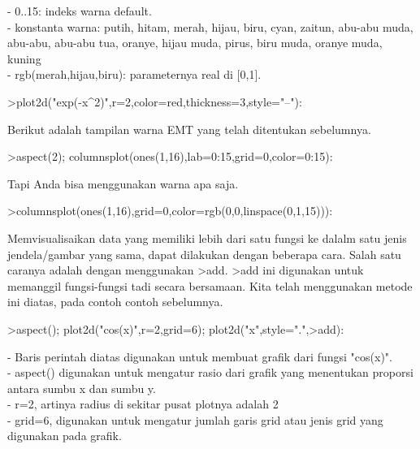 \documentclass[a4paper,10pt]{article}
\begin{document}
\begin{eulernotebook}
\begin{eulercomment}
\begin{eulercomment}
\begin{eulercomment}
\begin{eulercomment}
\begin{eulercomment}
- 0..15: indeks warna default.\\
- konstanta warna: putih, hitam, merah, hijau, biru, cyan, zaitun,
abu-abu muda, abu-abu, abu-abu tua, oranye, hijau muda, pirus, biru
muda, oranye muda, kuning\\
- rgb(merah,hijau,biru): parameternya real di [0,1].
\end{eulercomment}
\begin{eulerprompt}
>plot2d("exp(-x^2)",r=2,color=red,thickness=3,style="--"):
\end{eulerprompt}
\begin{eulercomment}
Berikut adalah tampilan warna EMT yang telah ditentukan sebelumnya.
\end{eulercomment}
\begin{eulerprompt}
>aspect(2); columnsplot(ones(1,16),lab=0:15,grid=0,color=0:15):
\end{eulerprompt}
\begin{eulercomment}
Tapi Anda bisa menggunakan warna apa saja.
\end{eulercomment}
\begin{eulerprompt}
>columnsplot(ones(1,16),grid=0,color=rgb(0,0,linspace(0,1,15))):
\end{eulerprompt}
\begin{eulercomment}
Memvisualisaikan data yang memiliki lebih dari satu fungsi ke dalalm
satu jenis jendela/gambar yang sama, dapat dilakukan dengan beberapa
cara. Salah satu caranya adalah dengan menggunakan \textgreater{}add. \textgreater{}add ini
digunakan untuk memanggil fungsi-fungsi tadi secara bersamaan. Kita
telah menggunakan metode ini diatas, pada contoh contoh sebelumnya.
\end{eulercomment}
\begin{eulerprompt}
>aspect(); plot2d("cos(x)",r=2,grid=6); plot2d("x",style=".",>add):
\end{eulerprompt}
\begin{eulercomment}
- Baris perintah diatas digunakan untuk membuat grafik dari fungsi
"cos(x)".\\
- aspect() digunakan untuk mengatur rasio dari grafik yang menentukan
proporsi antara sumbu x dan sumbu y.\\
- r=2, artinya radius di sekitar pusat plotnya adalah 2\\
- grid=6, digunakan untuk mengatur jumlah garis grid atau jenis grid
yang digunakan pada grafik.


\end{eulercomment}
\end{eulercomment}
\end{eulercomment}
\end{eulercomment}
\end{eulercomment}
\end{eulernotebook}
\end{document}
